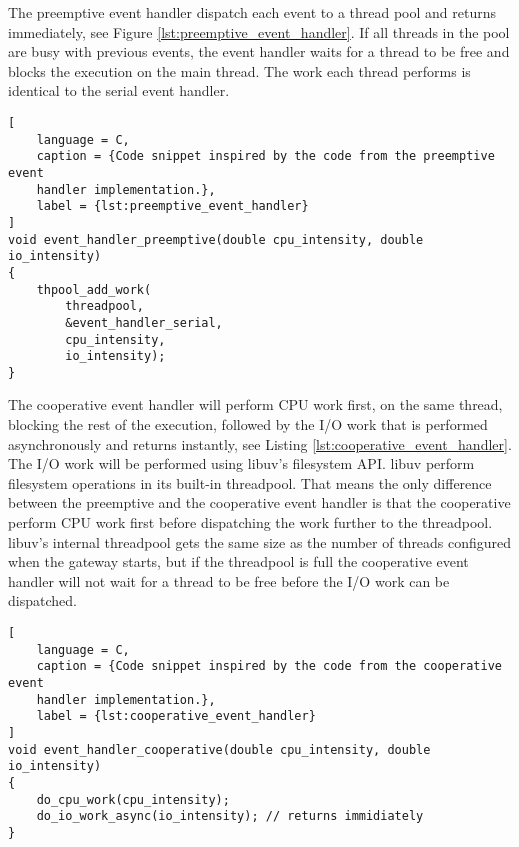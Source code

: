 The preemptive event handler dispatch each event to a thread pool and returns
immediately, see Figure \ref{lst:preemptive_event_handler}. If all threads in
the pool are busy with previous events, the event handler waits for a thread to
be free and blocks the execution on the main thread. The work each thread
performs is identical to the serial event handler.

\begin{lstlisting}[
    language = C,
    caption = {Code snippet inspired by the code from the preemptive event
    handler implementation.},
    label = {lst:preemptive_event_handler}
]
void event_handler_preemptive(double cpu_intensity, double io_intensity)
{
    thpool_add_work(
        threadpool,
        &event_handler_serial,
        cpu_intensity,
        io_intensity);
}
\end{lstlisting}

The cooperative event handler will perform CPU work first, on the same thread,
blocking the rest of the execution, followed by the I/O work that is performed
asynchronously and returns instantly, see Listing
\ref{lst:cooperative_event_handler}. The I/O work will be performed using
libuv's filesystem API. libuv perform filesystem operations in its built-in
threadpool. That means the only difference between the preemptive and the
cooperative event handler is that the cooperative perform CPU work first before
dispatching the work further to the threadpool. libuv's internal threadpool
gets the same size as the number of threads configured when the gateway starts,
but if the threadpool is full the cooperative event handler will not wait for a
thread to be free before the I/O work can be dispatched.

\begin{lstlisting}[
    language = C,
    caption = {Code snippet inspired by the code from the cooperative event
    handler implementation.},
    label = {lst:cooperative_event_handler}
]
void event_handler_cooperative(double cpu_intensity, double io_intensity)
{
    do_cpu_work(cpu_intensity);
    do_io_work_async(io_intensity); // returns immidiately
}
\end{lstlisting}

